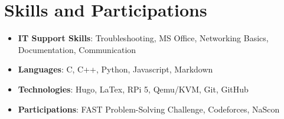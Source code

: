 \documentclass[letterpaper,11pt]{article}
\begin{document}
	\section{Skills and Participations}
	\begin{itemize}[leftmargin=*]
		\item \textbf{IT Support Skills}{: Troubleshooting, MS Office, Networking Basics, Documentation, Communication}
		\item \textbf{Languages}{: C, C++, Python, Javascript, Markdown}
		\item \textbf{Technologies}{: Hugo, LaTex, RPi 5, Qemu/KVM, Git, GitHub}
		\item \textbf{Participations}{: FAST Problem-Solving Challenge, Codeforces, NaScon}
	\end{itemize}
\end{document}
